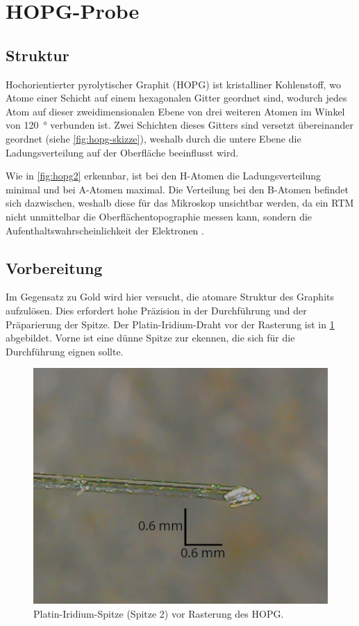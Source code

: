\section{HOPG-Probe}\label{sec:hopg-probe}
\subsection*{Struktur}
Hochorientierter pyrolytischer Graphit (HOPG) ist kristalliner Kohlenstoff, wo Atome einer Schicht
auf einem hexagonalen Gitter geordnet sind, wodurch jedes Atom auf dieser zweidimensionalen
Ebene von drei weiteren Atomen im Winkel von \SI{120}{\degree} verbunden ist. Zwei Schichten
dieses Gitters sind versetzt übereinander geordnet (siehe \cref{fig:hopg-skizze}), weshalb durch die
untere Ebene die Ladungsverteilung auf der Oberfläche beeinflusst wird.\par Wie in
\cref{fig:hopg2} erkennbar, ist bei den H-Atomen die Ladungsverteilung minimal und bei A-Atomen maximal.
Die Verteilung bei den B-Atomen befindet sich dazwischen, weshalb diese für das Mikroskop unsichtbar werden,
da ein RTM nicht unmittelbar die Oberflächentopographie messen kann, sondern die Aufenthaltswahrscheinlichkeit der
Elektronen \cite{rtm-leitpfaden}.



\subsection*{Vorbereitung}
Im Gegensatz zu Gold wird hier versucht, die atomare Struktur des Graphits aufzulösen.
Dies erfordert hohe Präzision in der Durchführung und der Präparierung der Spitze. Der Platin-Iridium-Draht
vor der Rasterung ist in \cref{fig:spitze_hopg_vorher_v2} abgebildet. Vorne ist eine dünne Spitze zur ekennen,
die sich für die Durchführung eignen sollte.

\begin{figure}[htb]
	\centering
	\includegraphics[width=0.5\linewidth]{figs/spitze_hopg_vorher_v2.png}
	\caption{Platin-Iridium-Spitze (Spitze 2) vor Rasterung des HOPG.}
	\label{fig:spitze_hopg_vorher_v2}
\end{figure}

